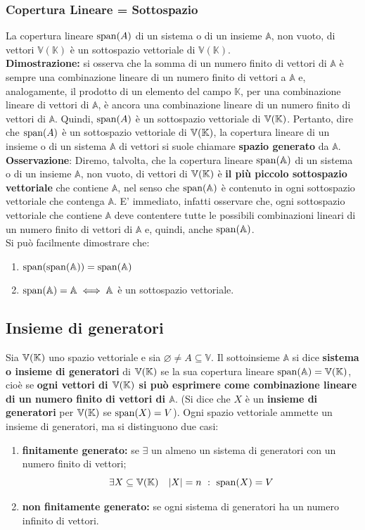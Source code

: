 \documentclass[../main.tex]{subfiles}
\begin{document}
\subsubsection{Copertura Lineare = Sottospazio}
La copertura lineare $\operatorname{span}(A)$ di un sistema o di un insieme $\mathbb A$, non
vuoto, di vettori $\mathbb V(\mathbb K)$ è un sottospazio vettoriale di
$\mathbb V(\mathbb K)$.\\ \textbf{Dimostrazione:} si osserva che la somma di un
numero finito di vettori di $\mathbb A$ è sempre una combinazione lineare di un
numero finito di vettori a $\mathbb A$ e, analogamente, il prodotto di un
elemento del campo $\mathbb K$, per una combinazione lineare di vettori di
$\mathbb A$, è ancora una combinazione lineare di un numero finito di vettori
di $\mathbb A$. Quindi, $\operatorname{span}(A)$ è un sottospazio vettoriale di $\mathbb{V} (\mathbb{K})$.
Pertanto, dire che $\operatorname{span}(A)$ è un sottospazio vettoriale di $\mathbb{V} (\mathbb{K})$, la copertura
lineare di un insieme o di un sistema $\mathbb A$ di vettori si suole chiamare
\textbf{spazio generato} da $\mathbb A$.\\ \textbf{Osservazione}: Diremo,
talvolta, che la copertura lineare $\operatorname{span}(\mathbb{A})$ di un sistema o di un insieme $\mathbb
    A$, non vuoto, di vettori di $\mathbb{V} (\mathbb{K})$ è \textbf{il più piccolo sottospazio
    vettoriale} che contiene $\mathbb A$, nel senso che $\operatorname{span}(\mathbb{A})$ è contenuto in ogni
sottospazio vettoriale che contenga $\mathbb A$. E' immediato, infatti
osservare che, ogni sottospazio vettoriale che contiene $\mathbb A$ deve
contentere tutte le possibili combinazioni lineari di un numero finito di
vettori di $\mathbb A$ e, quindi, anche $\operatorname{span}(\mathbb{A})$.\\ Si può facilmente dimostrare
che:
\begin{enumerate}
    \item $\operatorname{span}(\operatorname{span}(\mathbb{A})) = \operatorname{span}(\mathbb{A})$
    \item $\operatorname{span}(\mathbb{A}) = \mathbb A \iff \mathbb A$ è un sottospazio vettoriale.
\end{enumerate}

\subsection{Insieme di generatori}
Sia $\mathbb{V} (\mathbb{K})$ uno spazio vettoriale e sia $\varnothing \ne A \subseteq \mathbb V$.
Il sottoinsieme $\mathbb A$ si dice \textbf{sistema o insieme di generatori} di
$\mathbb{V} (\mathbb{K})$ se la sua copertura lineare $\operatorname{span}(\mathbb{A}) = \mathbb{V} (\mathbb{K})$, cioè se \textbf{ogni vettori di
    $\mathbb{V} (\mathbb{K})$ si può esprimere come combinazione lineare di un numero finito di vettori
    di $\mathbb A$}. (Si dice che $X$ è un \textbf{insieme di generatori} per $\mathbb{V} (\mathbb{K})$
se $\operatorname{span}(X) = V$). Ogni spazio vettoriale ammette un insieme di generatori, ma
si distinguono due casi:
\begin{enumerate}
    \item \textbf{finitamente generato:} se $\exists$ un almeno un sistema di generatori con un numero finito di vettori;
          \[
              \exists X \subseteq \V \ \ \ |X|=n \ : \ \Span(X) = V
          \]
    \item \textbf{non finitamente generato:} se ogni sistema di generatori ha un numero infinito di vettori.
\end{enumerate}
\end{document}

